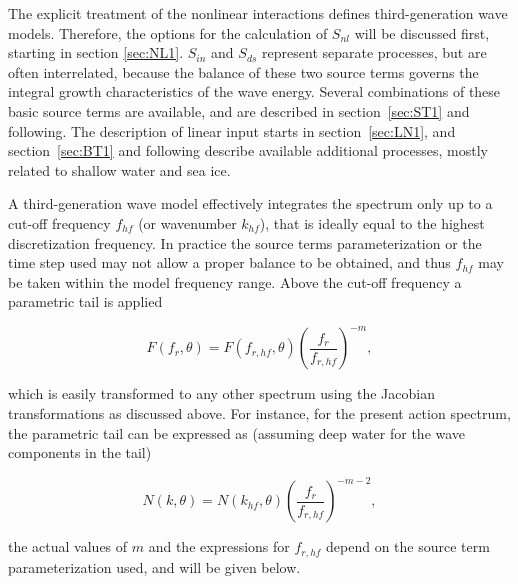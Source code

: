 The explicit treatment of the nonlinear interactions defines third-generation wave
models. Therefore, the options for the calculation of $S_{nl}$ will be
discussed first, starting in section \ref{sec:NL1}. $S_{in}$ and $S_{ds}$
represent separate processes, but are often interrelated,
because the balance of these two source terms governs the integral growth
characteristics of the wave energy. Several combinations of these basic source
terms are available, and are described in section~\ref{sec:ST1} and following.
The description of linear input starts in section~\ref{sec:LN1}, and
section~\ref{sec:BT1} and following describe available additional processes, mostly
related to shallow water and sea ice. 


A third-generation wave model effectively integrates the spectrum only up to a
cut-off frequency $f_{hf}$ (or wavenumber $k_{hf}$), that is ideally equal to the 
highest discretization frequency. In practice the source terms parameterization or the time step used may not allow a proper 
balance to be obtained, and thus $f_{hf}$  may be taken within the model frequency range. Above the cut-off frequency a
parametric tail is applied \citep[e.g.,][]{art:WAM88}


\begin{equation}
F(f_r,\theta) = F(f_{r,hf},\theta) \left ( \frac{f_r}{f_{r,hf}}
\right ) ^{-m} \label{eq:tail_E_f} ,
\end{equation}

\noindent
which is easily transformed to any other spectrum using the Jacobian
transformations as discussed above. For instance, for the present action
spectrum, the parametric tail can be expressed as (assuming deep water for the
wave components in the tail)


\begin{equation}
N(k,\theta) = N(k_{hf},\theta) \left ( \frac{f_r}{f_{r,hf}}
\right ) ^{-m-2} \label{eq:tail_N_k} ,
\end{equation}

\noindent
the actual values of $m$ and the expressions for $f_{r,hf}$ depend on the
source term parameterization used, and will be given below.

